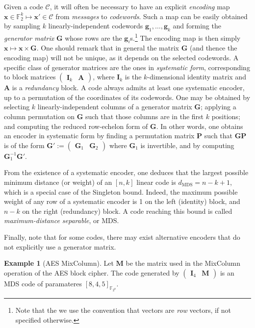 \documentclass[11pt,a4paper]{article}
\theoremstyle{definition}
\newtheorem{example}{Example}
\newcommand\ftwo{\mathbb{F}_{2}}
\newcommand\code{\mathcal{C}}
\begin{document}
Given a code $\code$, it will often be necessary to have an explicit \emph{encoding} map $\bm{x} \in \ftwo^k \mapsto \bm{x}' \in \code$ from \emph{messages} to \emph{codewords}. Such a map can be easily obtained by sampling $k$ linearly-independent codewords
$\bm{g}_{1},\ldots,\bm{g}_{k}$ and forming the \emph{generator matrix} $\bm{G}$ whose rows are the $\bm{g}_i$s.\footnote{Note that the we use the convention that vectors are \emph{row} vectors, if not specified otherwise.} The encoding map is then
simply $\bm{x} \mapsto \bm{x}\times\bm{G}$. One should remark that in general the matrix $\bm{G}$ (and thence the encoding map) will not be unique, as it depends on the selected codewords. A specific class of generator matrices are the ones in
\emph{systematic form}, corresponding to block matrices $\begin{pmatrix}\bm{I}_k & \bm{A}\end{pmatrix}$, where $\bm{I}_k$ is the $k$-dimensional identity matrix and $\bm{A}$ is a \emph{redundancy} block. A code always admits at least one systematic encoder, up to a permutation of the coordinates
of its codewords. One may be obtained by selecting $k$ linearly-independent columns of a generator matrix $\bm{G}$; applying a column permutation on $\bm{G}$ such that those columns are in the first $k$ positions; and computing the reduced row-echelon form
of $\bm{G}$. In other words, one obtains an encoder in systematic form by finding a permutation matrix $\bm{P}$ such that $\bm{GP}$ is of the form $\bm{G}' := \begin{pmatrix}\bm{G}_1 & \bm{G}_2\end{pmatrix}$ where $\bm{G}_1$ is invertible, and by computing
$\bm{G}_1^{-1}\bm{G}'$.

From the existence of a systematic encoder, one deduces that the largest possible minimum distance (or weight) of an $[n,k]$ linear code is $d_{\text{MDS}} = n-k+1$, which is a special case of the Singleton bound. Indeed, the maximum possible
weight of any row of a systematic encoder is 1 on the left (identity) block, and $n-k$ on the right (redundancy) block. A code reaching this bound is called \emph{maximum-distance separable}, or MDS.

Finally, note that for some codes, there may exist alternative encoders
that do not explicitly use a generator matrix.

\begin{example}[AES MixColumn]
	Let $\bm{M}$ be the matrix used in the MixColumn operation of the AES block cipher. The code generated by $\begin{pmatrix}\bm{I}_4 & \bm{M}\end{pmatrix}$ is an MDS code of paramateres $[8,4,5]_{\mathbb{F}_{2^8}}$.
\end{example}
\end{document}
